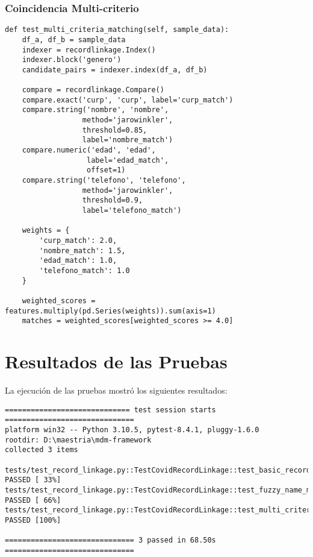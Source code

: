 \documentclass[12pt]{article}
\begin{document}
\subsubsection{Coincidencia Multi-criterio}
\begin{lstlisting}[caption=Prueba de coincidencia multi-criterio con pesos]
def test_multi_criteria_matching(self, sample_data):
    df_a, df_b = sample_data
    indexer = recordlinkage.Index()
    indexer.block('genero')
    candidate_pairs = indexer.index(df_a, df_b)
    
    compare = recordlinkage.Compare()
    compare.exact('curp', 'curp', label='curp_match')
    compare.string('nombre', 'nombre', 
                  method='jarowinkler', 
                  threshold=0.85,
                  label='nombre_match')
    compare.numeric('edad', 'edad', 
                   label='edad_match',
                   offset=1)
    compare.string('telefono', 'telefono', 
                  method='jarowinkler', 
                  threshold=0.9,
                  label='telefono_match')
    
    weights = {
        'curp_match': 2.0,
        'nombre_match': 1.5,
        'edad_match': 1.0,
        'telefono_match': 1.0
    }
    
    weighted_scores = features.multiply(pd.Series(weights)).sum(axis=1)
    matches = weighted_scores[weighted_scores >= 4.0]
\end{lstlisting}

\section{Resultados de las Pruebas}

La ejecución de las pruebas mostró los siguientes resultados:

\begin{verbatim}
============================= test session starts ==============================
platform win32 -- Python 3.10.5, pytest-8.4.1, pluggy-1.6.0
rootdir: D:\maestria\mdm-framework
collected 3 items

tests/test_record_linkage.py::TestCovidRecordLinkage::test_basic_record_linkage PASSED [ 33%]
tests/test_record_linkage.py::TestCovidRecordLinkage::test_fuzzy_name_matching PASSED [ 66%]
tests/test_record_linkage.py::TestCovidRecordLinkage::test_multi_criteria_matching PASSED [100%]

============================== 3 passed in 68.50s ==============================
\end{verbatim}
\end{document}
